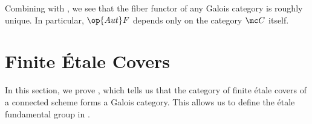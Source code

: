 \documentclass{amsart}
\begin{document}
\begin{remark} \label{rem:fiber-functor-unique}
    Combining  with , we see that the fiber functor of any Galois category is roughly unique. In particular, $\op{Aut}F$ depends only on the category $\mc C$ itself.
\end{remark}

\section{Finite \'Etale Covers} \label{sec:finite-et-covers}
In this section, we prove , which tells us that the category of finite \'etale covers of a connected scheme forms a Galois category. This allows us to define the \'etale fundamental group in .
\end{document}
